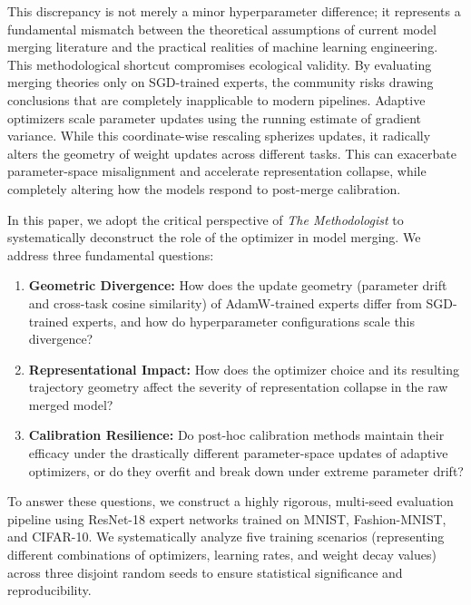 \documentclass{article}
\theoremstyle{plain}
\theoremstyle{definition}
\theoremstyle{remark}
\begin{document}
This discrepancy is not merely a minor hyperparameter difference; it represents a fundamental mismatch between the theoretical assumptions of current model merging literature and the practical realities of machine learning engineering. This methodological shortcut compromises ecological validity. By evaluating merging theories only on SGD-trained experts, the community risks drawing conclusions that are completely inapplicable to modern pipelines. Adaptive optimizers scale parameter updates using the running estimate of gradient variance. While this coordinate-wise rescaling spherizes updates, it radically alters the geometry of weight updates across different tasks. This can exacerbate parameter-space misalignment and accelerate representation collapse, while completely altering how the models respond to post-merge calibration.

In this paper, we adopt the critical perspective of \textit{The Methodologist} to systematically deconstruct the role of the optimizer in model merging. We address three fundamental questions:
\begin{enumerate}
    \item \textbf{Geometric Divergence:} How does the update geometry (parameter drift and cross-task cosine similarity) of AdamW-trained experts differ from SGD-trained experts, and how do hyperparameter configurations scale this divergence?
    \item \textbf{Representational Impact:} How does the optimizer choice and its resulting trajectory geometry affect the severity of representation collapse in the raw merged model?
    \item \textbf{Calibration Resilience:} Do post-hoc calibration methods maintain their efficacy under the drastically different parameter-space updates of adaptive optimizers, or do they overfit and break down under extreme parameter drift?
\end{enumerate}

To answer these questions, we construct a highly rigorous, multi-seed evaluation pipeline using ResNet-18 expert networks trained on MNIST, Fashion-MNIST, and CIFAR-10. We systematically analyze five training scenarios (representing different combinations of optimizers, learning rates, and weight decay values) across three disjoint random seeds to ensure statistical significance and reproducibility.
\end{document}
